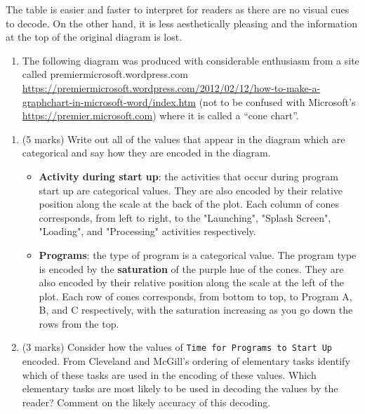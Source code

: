 \documentclass[9pt,letter]{article}
\providecommand{\tightlist}{%
  \setlength{\itemsep}{0pt}\setlength{\parskip}{0pt}}
\begin{document}
\begin{enumerate}
  The table is easier and faster to interpret for readers as there are
  no visual cues to decode. On the other hand, it is less aesthetically
  pleasing and the information at the top of the original diagram is
  lost.

  \begin{enumerate}
  \def\labelenumii{(\alph{enumii})}
  \setcounter{enumii}{1}
  \tightlist
  \item
    The following diagram was produced with considerable enthusiasm from
    a site called premiermicrosoft.wordpress.com
    \href{http://premiermicrosoft.wordpress.com/2012/02/12/how-to-make-a-graphchart-in-microsoft-word/}{\color {blue} https://premiermicrosoft.wordpress.com/2012/02/12/how-to-make-a-graphchart-in-microsoft-word/index.htm}
    (not to be confused with Microsoft's
    \url{https://premier.microsoft.com}) where it is called a ``cone
    chart''.
  \end{enumerate}

  \begin{enumerate}
  \def\labelenumii{\roman{enumii}.}
  \tightlist
  \item
    (5 marks) Write out all of the values that appear in the diagram
    which are categorical and say how they are encoded in the diagram.
    \vspace{5mm}

    \begin{itemize}
    \item \textbf{Activity during start up}: the activities that occur during program start up are categorical values. They are also encoded by their relative position along the scale at the back of the plot. Each column of cones corresponds, from left to right, to the "Launching", "Splash Screen", "Loading", and "Processing" activities respectively.
    \item \textbf{Programs}: the type of program is a categorical value. The program type is encoded by the \textbf{saturation} of the purple hue of the cones. They are also encoded by their relative position along the scale at the left of the plot. Each row of cones corresponds, from bottom to top, to Program A, B, and C respectively, with the saturation increasing as you go down the rows from the top.
    \end{itemize}

    \vspace{5mm}
  \item
    (3 marks) Consider how the values of
    \texttt{Time\ for\ Programs\ to\ Start\ Up} encoded. From Cleveland
    and McGill's ordering of elementary tasks identify which of these
    tasks are used in the encoding of these values. Which elementary
    tasks are most likely to be used in decoding the values by the
    reader? Comment on the likely accuracy of this decoding.
    \vspace{5mm}


\end{enumerate}
\end{enumerate}
\end{document}
